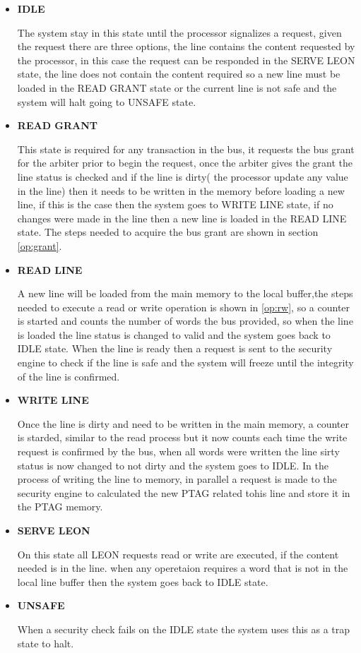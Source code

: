 \begin{itemize}
 \item{\textbf{IDLE}}
 
 The system stay in this state  until the processor signalizes a request, given the request 
 there are three options, the line contains the content requested by the processor, in this case
 the request can be responded in the SERVE LEON state, the line does not contain the content required
 so a new line must be loaded in the READ GRANT state or the current line is not safe and the system will halt
 going to UNSAFE state.
 
  \item{\textbf{READ GRANT}}
  
  This state is required for any transaction in the bus, it requests the bus grant for the arbiter prior to 
  begin the request, once the arbiter gives the grant the line status is checked and if the line is dirty( the processor
  update any value in the line) then it needs to be written in the memory before loading a new line, if this is the case
   then the system goes to WRITE LINE state, if no changes were made in the line then a new line is loaded in the READ LINE 
   state. The steps needed to acquire the bus grant are shown in section \ref{op:grant}.
  
  \item{\textbf{READ LINE}}
  
  
  A new line will be loaded from the main memory to the local buffer,the  steps needed to execute
   a read or write operation is shown  in \ref{op:rw}, so a counter is started and counts the 
  number of words the bus provided, so when the line is loaded the line status is changed to valid and
  the system goes back to IDLE state. When  the line is ready  then a request is sent to the security engine 
  to check if the line is safe and the system will freeze until the integrity of the line is confirmed.

 \item{\textbf{WRITE LINE}}
 
 Once the line is dirty and need to be written in the main memory, a counter is  starded, similar to the read process 
 but it now counts each time the write request is confirmed by the bus, when all words were written  the line sirty status 
 is now changed to not dirty and the system goes to IDLE. In the process of writing the line to memory, in parallel a request is made 
 to the security engine to calculated the new PTAG related tohis line and store it in the PTAG memory.

 \item{\textbf{SERVE LEON}}

 On this state  all LEON requests  read or write are executed, if the content needed is  in the line. 
 when any operetaion requires a word  that is not in the local line buffer then the system  goes back to IDLE state.
 
 
 \item{\textbf{UNSAFE}}
 
 
When a security check fails  on the IDLE state the system uses this as a trap state to halt.

\end{itemize}




